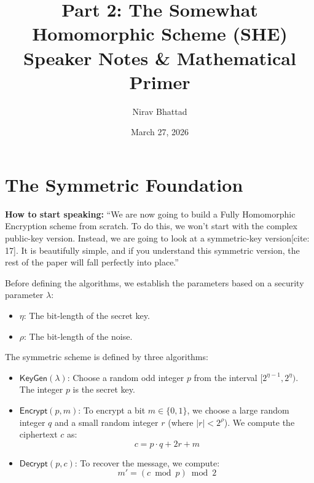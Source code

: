 \documentclass[11pt]{article}
\title{Part 2: The Somewhat Homomorphic Scheme (SHE) \\ \large Speaker Notes \& Mathematical Primer}
\author{Nirav Bhattad}
\date{March 27, 2026}
\begin{document}
\maketitle

\section{The Symmetric Foundation}

\begin{speakernote}
\textbf{How to start speaking:} 
``We are now going to build a Fully Homomorphic Encryption scheme from scratch. To do this, we won't start with the complex public-key version. Instead, we are going to look at a symmetric-key version[cite: 17]. It is beautifully simple, and if you understand this symmetric version, the rest of the paper will fall perfectly into place.''
\end{speakernote}

Before defining the algorithms, we establish the parameters based on a security parameter $\lambda$:
\begin{itemize}
    \item $\eta$: The bit-length of the secret key.
    \item $\rho$: The bit-length of the noise.
\end{itemize}

The symmetric scheme is defined by three algorithms:

\begin{itemize}
    \item $\mathsf{KeyGen}(\lambda)$: Choose a random odd integer $p$ from the interval $[2^{\eta-1}, 2^\eta)$. The integer $p$ is the secret key.
    
    \item $\mathsf{Encrypt}(p, m)$: To encrypt a bit $m \in \{0, 1\}$, we choose a large random integer $q$ and a small random integer $r$ (where $|r| < 2^\rho$). We compute the ciphertext $c$ as:
    \begin{equation}
        c = p \cdot q + 2r + m
    \end{equation}
    
    \item $\mathsf{Decrypt}(p, c)$: To recover the message, we compute:
    \begin{equation}
        m' = (c \bmod p) \bmod 2
    \end{equation}
\end{itemize}
\end{document}
